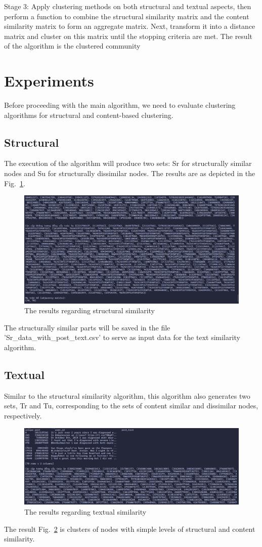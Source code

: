 \documentclass[conference]{IEEEtran}
\begin{document}
Stage 3: Apply clustering methods on both structural and textual aspects, then perform a function to combine the structural similarity matrix and the content similarity matrix to form an aggregate matrix.
Next, transform it into a distance matrix and cluster on this matrix until the stopping criteria are met.
The result of the algorithm is the clustered community
\section{Experiments}
Before proceeding with the main algorithm, we need to evaluate clustering algorithms for structural and content-based clustering.
\subsection{Structural}
The execution of the algorithm will produce two sets: Sr for structurally similar nodes and Su for structurally dissimilar nodes. The results are as depicted in the Fig.~\ref{fig7}.
\begin{figure}[htbp]
    \centerline{\includegraphics[scale=0.15]{fig7.png}}
    \caption{The results regarding structural similarity}
    \label{fig7}
\end{figure}
The structurally similar parts will be saved in the file 'Sr\_data\_with\_post\_text.csv' to serve as input data for the text similarity algorithm.

\subsection{Textual}

Similar to the structural similarity algorithm, this algorithm also generates two sets, Tr and Tu, corresponding to the sets of content similar and dissimilar nodes, respectively.
\begin{figure}[htbp]
    \centerline{\includegraphics[scale=0.15]{fig8.png}}
    \caption{The results regarding textual similarity}
    \label{fig8}
\end{figure}
The result Fig.~\ref{fig8} is clusters of nodes with simple levels of structural and content similarity.
\end{document}
